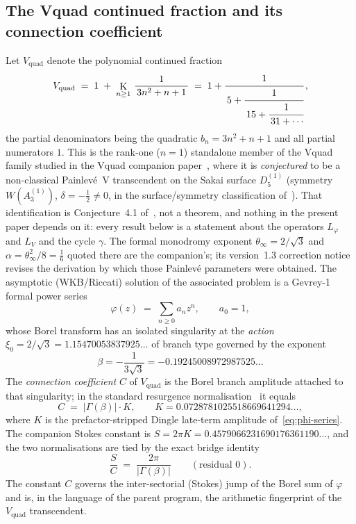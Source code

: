 \documentclass[11pt,reqno]{amsart}
\renewcommand{\_}{\vquadorigunderscore\allowbreak}
\theoremstyle{plain}
\theoremstyle{definition}
\newcommand{\Vquad}{V_{\mathrm{quad}}}
\newcommand{\Lphi}{L_{\varphi}}
\newcommand{\LV}{L_{V}}
\newcommand{\xizero}{\xi_0}
\providecommand{\C}{}\renewcommand{\C}{C}
\DeclareMathOperator*{\K}{K}
\begin{document}
\subsection{The V\_quad continued fraction and its connection coefficient}
Let $\Vquad$ denote the polynomial continued fraction
\begin{equation}\label{eq:vquad-pcf}
  \Vquad \;=\; 1 \;+\; \K_{n\ge 1}\,\frac{1}{\,3n^{2}+n+1\,}
  \;=\; 1+\cfrac{1}{\,5+\cfrac{1}{\,15+\cfrac{1}{\,31+\cdots}}}\,,
\end{equation}
the partial denominators being the quadratic $b_n=3n^2+n+1$ and all partial numerators $1$.
This is the rank-one ($n=1$) standalone member of the V\_quad family studied in the V\_quad
companion paper~\cite{Vquad}, where it is \emph{conjectured} to be a non-classical
Painlev\'e~V transcendent on the Sakai surface $D_5^{(1)}$ (symmetry $W(A_3^{(1)})$,
$\delta=-\tfrac12\ne0$, in the surface/symmetry classification of~\cite{SakaiClass}).
That identification is Conjecture~4.1 of~\cite{Vquad}, not a theorem, and nothing in the
present paper depends on it: every result below is a statement about the operators $\Lphi$
and $\LV$ and the cycle $\gamma$. The formal monodromy exponent $\theta_\infty=2/\sqrt3$ and
$\alpha=\theta_\infty^2/8=\tfrac16$ quoted there are the companion's; its version~1.3
correction notice~\cite{VquadV13} revises the derivation by which those Painlev\'e
parameters were obtained.
The asymptotic (WKB/Riccati) solution of the associated problem is a Gevrey-1 formal power
series
\begin{equation}\label{eq:phi-series}
  \varphi(z)\;=\;\sum_{n\ge 0} a_n z^n ,\qquad a_0=1,
\end{equation}
whose Borel transform has an isolated singularity at the \emph{action}
$\xizero=2/\sqrt3=1.15470053837925\ldots$ of branch type governed by the exponent
\begin{equation}\label{eq:beta}
  \beta=-\frac{1}{3\sqrt3}=-0.19245008972987525\ldots
\end{equation}
The \emph{connection coefficient} $\C$ of $\Vquad$ is the Borel branch amplitude attached to
that singularity; in the standard resurgence normalisation~\cite{Dingle,BerryHowls,StokesNote}
it equals
\begin{equation}\label{eq:C-skeleton}
  \C \;=\; \lvert\Gamma(\beta)\rvert\cdot K,\qquad
  K=0.0728781025518669641294\ldots,
\end{equation}
where $K$ is the prefactor-stripped Dingle late-term amplitude of~\eqref{eq:phi-series}. The
companion Stokes constant is $S=2\pi K=0.4579066231690176361190\ldots$, and the two normalisations
are tied by the exact bridge identity
\begin{equation}\label{eq:bridge}
  \frac{S}{\C}\;=\;\frac{2\pi}{\lvert\Gamma(\beta)\rvert}\qquad(\text{residual }0).
\end{equation}
The constant $\C$ governs the inter-sectorial (Stokes) jump of the Borel sum of $\varphi$ and is,
in the language of the parent program, the arithmetic fingerprint of the $\Vquad$ transcendent.
\end{document}
